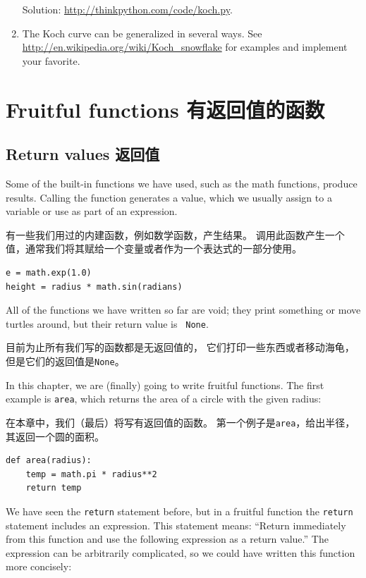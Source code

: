 \documentclass[10pt]{book}
\begin{document}
\begin{CJK}{UTF8}{gbsn}
\begin{exercise}
\begin{enumerate}
Solution: \url{http://thinkpython.com/code/koch.py}.

\item The Koch curve can be generalized in several ways.  See
\url{http://en.wikipedia.org/wiki/Koch_snowflake} for examples and
implement your favorite.

\end{enumerate}
\end{exercise}


\chapter{Fruitful functions 有返回值的函数}
\label{fruitchap}

\section{Return values 返回值}

Some of the built-in functions we have used, such as the math
functions, produce results.  Calling the function generates a
value, which we usually assign to a variable or use as part of an
expression.

有一些我们用过的内建函数，例如数学函数，产生结果。
调用此函数产生一个值，通常我们将其赋给一个变量或者作为一个表达式的一部分使用。

\begin{verbatim}
e = math.exp(1.0)
height = radius * math.sin(radians)
\end{verbatim}
%
All of the functions we have written so far are void; they print
something or move turtles around, but their return value is {\tt
None}.

目前为止所有我们写的函数都是无返回值的，
它们打印一些东西或者移动海龟，但是它们的返回值是{\tt None}。

In this chapter, we are (finally) going to write fruitful functions.
The first example is {\tt area}, which returns the area of a circle
with the given radius:

在本章中，我们（最后）将写有返回值的函数。
第一个例子是{\tt area}，给出半径，其返回一个圆的面积。

\begin{verbatim}
def area(radius):
    temp = math.pi * radius**2
    return temp
\end{verbatim}
%
We have seen the {\tt return} statement before, but in a fruitful
function the {\tt return} statement includes
an expression.  This statement means: ``Return immediately from
this function and use the following expression as a return value.''
The expression can be arbitrarily complicated, so we could
have written this function more concisely:


\end{CJK}
\end{document}

